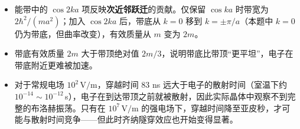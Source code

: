 \begin{insightbox}[物理图像]
\begin{itemize}
    \item 能带中的 $\cos2ka$ 项反映\textbf{次近邻跃迁}的贡献。仅保留 $\cos ka$ 时带宽为 $2\hbar^2/(ma^2)$；加入 $\cos2ka$ 后，带底从 $k=0$ 移到 $k=\pm\pi/a$（本题中 $k=0$ 仍为带底，但曲率改变），有效质量从 $m$ 变为 $2m$。
    \item 带底有效质量 $2m$ 大于带顶绝对值 $2m/3$，说明带底比带顶``更平坦''，电子在带底附近更难被加速。
    \item 对于常规电场 $10^2\,\text{V/m}$，穿越时间 83 ns 远大于电子的散射时间（室温下约 $10^{-14}\!\sim\!10^{-12}\,$s），电子在到达带顶之前就被散射，因此实际晶体中观察不到完整的布洛赫振荡。只有在 $10^7\,\text{V/m}$ 的强电场下，穿越时间降至亚皮秒，才可能与散射时间竞争——但此时齐纳隧穿效应也开始变得显著。
\end{itemize}
\end{insightbox}
